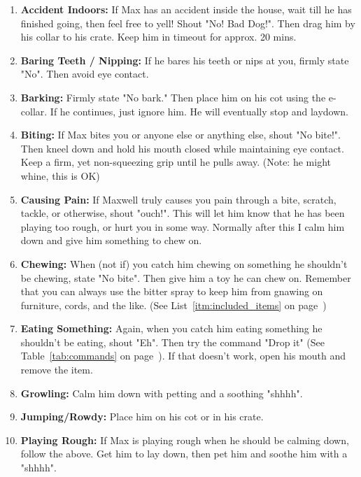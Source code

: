 \documentclass[pdftex,12pt]{article}
\begin{document}
\begin{enumerate}\label{itm:discipline}
    \item \textbf{Accident Indoors:} If Max has an accident inside the house,
        wait till he has finished going, then feel free to yell! Shout "No!
        Bad Dog!". Then drag him by his collar to his crate. Keep him in
        timeout for approx. 20 mins.
    \item \textbf{Baring Teeth / Nipping:} If he bares his teeth or nips at you,
        firmly state "No". Then avoid eye contact.
    \item \textbf{Barking:} Firmly state "No bark." Then place him on his cot
        using the e-collar. If he continues, just ignore him. He will
        eventually stop and laydown.
    \item \textbf{Biting:} If Max bites you or anyone else or anything else,
        shout "No bite!". Then kneel down and hold his mouth closed while
        maintaining eye contact. Keep a firm, yet non-squeezing grip until he
        pulls away. (Note: he might whine, this is OK)
    \item \textbf{Causing Pain:} If Maxwell truly causes you pain through a
        bite, scratch, tackle, or otherwise, shout "ouch!". This will let
        him know that he has been playing too rough, or hurt you in some way.
        Normally after this I calm him down and give him something to chew on.
    \item \textbf{Chewing:} When (not if) you catch him chewing on something he
        shouldn't be chewing, state "No bite". Then give him a toy he can chew
        on. Remember that you can always use the bitter spray to keep him from
        gnawing on furniture, cords, and the like. (See List~\ref{itm:included_items} on
        page~\pageref{itm:included_items})
    \item \textbf{Eating Something:} Again, when you catch him eating something
        he shouldn't be eating, shout "Eh". Then try the command "Drop it" (See
        Table~\ref{tab:commands} on page~\pageref{tab:commands}). If that
        doesn't work, open his mouth and remove the item.
    \item \textbf{Growling:} Calm him down with petting and a soothing "shhhh".
    \item \textbf{Jumping/Rowdy:} Place him on his cot or in his crate.
    \item \textbf{Playing Rough:} If Max is playing rough when he should be
        calming down, follow the above. Get him to lay down, then pet him and
        soothe him with a "shhhh".
\end{enumerate}
\end{document}
